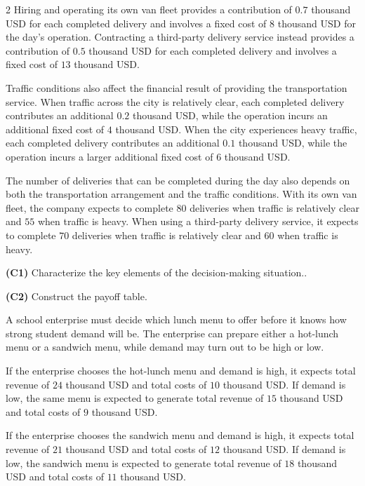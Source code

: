 \begin{multicols}{2}
		Hiring and operating its own van fleet provides a contribution of \(0.7\) thousand USD for each completed delivery and involves a fixed cost of \(8\) thousand USD for the day's operation. Contracting a third-party delivery service instead provides a contribution of \(0.5\) thousand USD for each completed delivery and involves a fixed cost of \(13\) thousand USD.
		
		Traffic conditions also affect the financial result of providing the transportation service. When traffic across the city is relatively clear, each completed delivery contributes an additional \(0.2\) thousand USD, while the operation incurs an additional fixed cost of \(4\) thousand USD. When the city experiences heavy traffic, each completed delivery contributes an additional \(0.1\) thousand USD, while the operation incurs a larger additional fixed cost of \(6\) thousand USD.
		
		The number of deliveries that can be completed during the day also depends on both the transportation arrangement and the traffic conditions. With its own van fleet, the company expects to complete \(80\) deliveries when traffic is relatively clear and \(55\) when traffic is heavy. When using a third-party delivery service, it expects to complete \(70\) deliveries when traffic is relatively clear and \(60\) when traffic is heavy.
		
		\begin{alphenum}
			\item \textbf{(C1)} Characterize the key elements of the decision-making situation.. 
			\item \textbf{(C2)} Construct the payoff table. 
		\end{alphenum}


		A school enterprise must decide which lunch menu to offer before it knows how strong student demand will be. The enterprise can prepare either a hot-lunch menu or a sandwich menu, while demand may turn out to be high or low. 
		
		If the enterprise chooses the hot-lunch menu and demand is high, it expects total revenue of \(24\) thousand USD and total costs of \(10\) thousand USD. If demand is low, the same menu is expected to generate total revenue of \(15\) thousand USD and total costs of \(9\) thousand USD.
		
		If the enterprise chooses the sandwich menu and demand is high, it expects total revenue of \(21\) thousand USD and total costs of \(12\) thousand USD. If demand is low, the sandwich menu is expected to generate total revenue of \(18\) thousand USD and total costs of \(11\) thousand USD.


\end{multicols}
